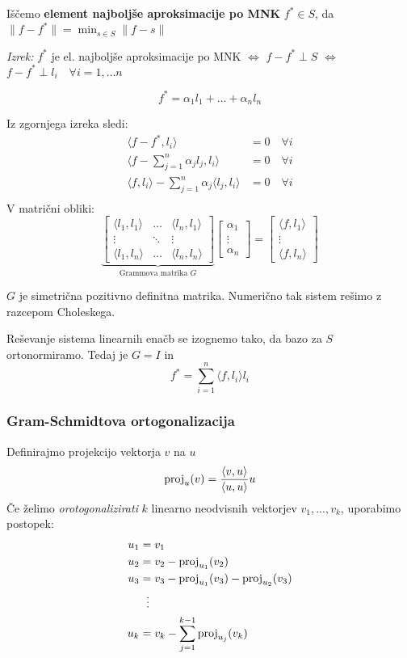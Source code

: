 \begin{multicols}{5}
Iščemo \textbf{element najboljše aproksimacije po MNK} $f^* \in S$, da $\| f - f^* \| = \min_{s \in S} \| f - s \| $

\textit{Izrek:} $f^*$ je el. najboljše aproksimacije po MNK $\iff$ $f-f^* \perp S$ $\iff$
$f-f^* \perp l_i \quad \forall i = 1,\dots n$

\[ f^* = \alpha_1 l_1 + \dots + \alpha_n l_n\]

Iz zgornjega izreka sledi:
\begin{align*}
\langle f - f^*, l_i \rangle &= 0 \quad \forall i\\
\langle f - \sum_{j=1}^n \alpha_j l_j, l_i \rangle &= 0 \quad \forall i\\
\langle f, l_i\rangle - \sum_{j=1}^n \alpha_j \langle  l_j, l_i \rangle &= 0 \quad \forall i\\
\end{align*}
V matrični obliki:
\[
    \underbrace{\begin{bmatrix}
        \langle l_1, l_1 \rangle & \dots & \langle l_n, l_1 \rangle \\
        \vdots & \ddots & \vdots \\
        \langle l_1, l_n \rangle & \dots & \langle l_n, l_n \rangle
    \end{bmatrix}}_{\text{Grammova matrika $G$}}
    \begin{bmatrix}
        \alpha_1 \\
        \vdots \\
        \alpha_n
    \end{bmatrix}
    =
    \begin{bmatrix}
        \langle f, l_1 \rangle \\
        \vdots \\
        \langle f, l_n \rangle
    \end{bmatrix}
\]

$G$ je simetrična pozitivno definitna matrika. Numerično tak sistem rešimo z razcepom Choleskega.


Reševanje sistema linearnih enačb se izognemo tako, da bazo za $S$ ortonormiramo. Tedaj je $G = I$ in
\[ f^* = \sum_{i=1}^n \langle f, l_i \rangle l_i \]

\subsubsection*{Gram-Schmidtova ortogonalizacija}
Definirajmo projekcijo vektorja $v$ na $u$
\[\textmd{proj}_u(v) = \frac{\langle v,u \rangle}{\langle u,u \rangle}u\]
Če želimo \emph{orotogonalizirati} $k$ linearno neodvisnih vektorjev $v_1, ..., v_k$, uporabimo postopek:
\begin{equation*}
    \begin{aligned}
    u_1 &= v_1 \\
    u_2 &= v_2 - \textmd{proj}_{u_1}(v_2) \\
    u_3 &= v_3 - \textmd{proj}_{u_1}(v_3) - \textmd{proj}_{u_2}(v_3) \\
    &\; \ \vdots \\
    u_k &= v_k - \sum_{j=1}^{k-1} \textmd{proj}_{u_j}(v_k)
    \end{aligned}
\end{equation*}



\end{multicols}
